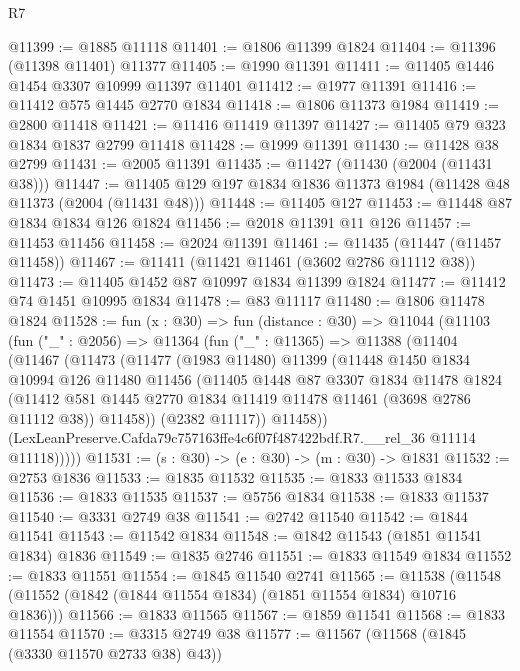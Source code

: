 \begin{lexlean}{R7}
\begin{coremodule}
@11399 := @1885 @11118
@11401 := @1806 @11399 @1824
@11404 := @11396 (@11398 @11401) @11377
@11405 := @1990 @11391
@11411 := @11405 @1446 @1454 @3307 @10999 @11397 @11401
@11412 := @1977 @11391
@11416 := @11412 @575 @1445 @2770 @1834
@11418 := @1806 @11373 @1984
@11419 := @2800 @11418
@11421 := @11416 @11419 @11397
@11427 := @11405 @79 @323 @1834 @1837 @2799 @11418
@11428 := @1999 @11391
@11430 := @11428 @38 @2799
@11431 := @2005 @11391
@11435 := @11427 (@11430 (@2004 (@11431 @38)))
@11447 := @11405 @129 @197 @1834 @1836 @11373 @1984 (@11428 @48 @11373 (@2004 (@11431 @48)))
@11448 := @11405 @127
@11453 := @11448 @87 @1834 @1834 @126 @1824
@11456 := @2018 @11391 @11 @126
@11457 := @11453 @11456
@11458 := @2024 @11391
@11461 := @11435 (@11447 (@11457 @11458))
@11467 := @11411 (@11421 @11461 (@3602 @2786 @11112 @38))
@11473 := @11405 @1452 @87 @10997 @1834 @11399 @1824
@11477 := @11412 @74 @1451 @10995 @1834
@11478 := @83 @11117
@11480 := @1806 @11478 @1824
@11528 := fun (x : @30) =>
  fun (distance : @30) =>
  @11044
    (@11103
      (fun ("_" : @2056) =>
      @11364
        (fun ("_" : @11365) =>
        @11388
          (@11404
            (@11467
              (@11473
                (@11477
                  (@1983 @11480)
                  @11399
                  (@11448
                    @1450
                    @1834
                    @10994
                    @126
                    @11480
                    @11456
                    (@11405
                      @1448
                      @87
                      @3307
                      @1834
                      @11478
                      @1824
                      (@11412 @581 @1445 @2770 @1834 @11419 @11478 @11461 (@3698 @2786 @11112 @38))
                      @11458))
                  (@2382 @11117))
                @11458))
            (LexLeanPreserve.Cafda79c757163ffe4c6f07f487422bdf.R7.__rel_36 @11114 @11118)))))
@11531 := (s : @30) -> (e : @30) -> (m : @30) -> @1831
@11532 := @2753 @1836
@11533 := @1835 @11532
@11535 := @1833 @11533 @1834
@11536 := @1833 @11535
@11537 := @5756 @1834
@11538 := @1833 @11537
@11540 := @3331 @2749 @38
@11541 := @2742 @11540
@11542 := @1844 @11541
@11543 := @11542 @1834
@11548 := @1842 @11543 (@1851 @11541 @1834) @1836
@11549 := @1835 @2746
@11551 := @1833 @11549 @1834
@11552 := @1833 @11551
@11554 := @1845 @11540 @2741
@11565 := @11538 (@11548 (@11552 (@1842 (@1844 @11554 @1834) (@1851 @11554 @1834) @10716 @1836)))
@11566 := @1833 @11565
@11567 := @1859 @11541
@11568 := @1833 @11554
@11570 := @3315 @2749 @38
@11577 := @11567 (@11568 (@1845 (@3330 @11570 @2733 @38) @43))

\end{coremodule}
\end{lexlean}
